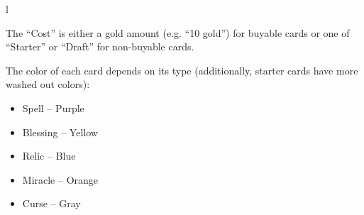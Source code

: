 \documentclass[dvipsnames,parskip,a4paper]{scrartcl}
\begin{document}
\begin{wrapfigure}{l}{}
\end{wrapfigure}

The ``Cost'' is either a gold amount (e.g. ``10 gold'') for buyable cards or one of ``Starter'' or ``Draft'' for non-buyable cards.

The color of each card depends on its type (additionally, starter cards have more washed out colors):
\begin{itemize}
\item Spell -- \colorbox{spellcolor}{Purple}
\item Blessing -- \colorbox{blessingcolor}{Yellow}
\item Relic -- \colorbox{reliccolor}{Blue}
\item Miracle -- \colorbox{miraclecolor}{Orange}
\item Curse -- \colorbox{cursecolor}{Gray}
\end{itemize}
\end{document}

